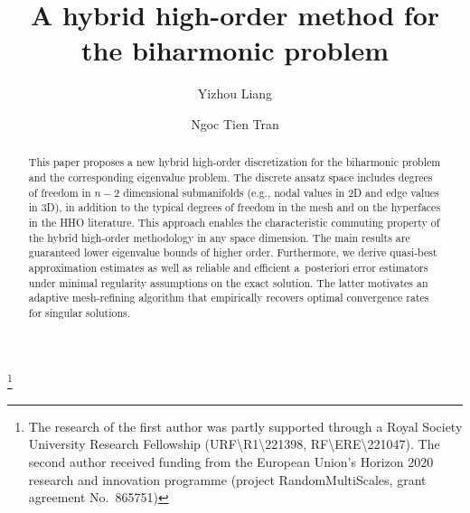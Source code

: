 \documentclass[a4paper]{amsart}
\numberwithin{equation}{section}
\theoremstyle{definition}
\theoremstyle{remark}
\numberwithin{theorem}{section}
\numberwithin{equation}{section}
\numberwithin{table}{section}
\numberwithin{figure}{section}
\begin{document}
	
\title[HHO for biharmonic problem]{A hybrid high-order method for the biharmonic problem}
\author[Y. Liang, N.~T.~Tran]
      {Yizhou Liang \and Ngoc Tien Tran}
\address{Mathematical Institute, University of Oxford, Woodstock Rd, OX2 6GG Oxford, UK}


\address{Institute of Mathematics, University of Augsburg, Universit\"atsstr.~12a, 86159 Augsburg, Germany}


\thanks{The research of the first author was partly supported through a Royal Society University Research Fellowship (URF\textbackslash R1\textbackslash 221398, RF\textbackslash ERE\textbackslash 221047). The second author received funding from the European Union's Horizon 2020 research and innovation programme (project RandomMultiScales, grant agreement No.~865751)}



\maketitle


\begin{abstract}
    This paper proposes a new hybrid high-order discretization for the biharmonic problem and the corresponding eigenvalue problem. The discrete ansatz space includes degrees of freedom in $n-2$ dimensional submanifolds (e.g., nodal values in 2D and edge values in 3D), in addition to the typical degrees of freedom in the mesh and on the hyperfaces in the HHO literature. This approach enables the characteristic commuting property of the hybrid high-order methodology in any space dimension. The main results are guaranteed lower eigenvalue bounds of higher order. Furthermore, we derive quasi-best approximation estimates as well as reliable and efficient a~posteriori error estimators under minimal regularity assumptions on the exact solution. The latter motivates an adaptive mesh-refining algorithm that empirically recovers optimal convergence rates for singular solutions.
\end{abstract}
\end{document}
